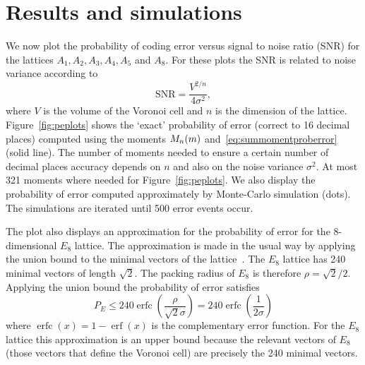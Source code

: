 \documentclass[journal]{IEEEtran}
\begin{document}
\section{Results and simulations}\label{sec:results-simulations}

We now plot the probability of coding error versus signal to noise ratio (SNR) for the lattices $A_1, A_2, A_3, A_4, A_5$ and $A_8$.  For these plots the SNR is related to noise variance according to~\cite{Viterbo_diamond_cutting_1996}
\[
\text{SNR} = \frac{V^{2/n}}{4\sigma^2},
\]
where $V$ is the volume of the Voronoi cell and $n$ is the dimension of the lattice.  Figure~\ref{fig:peplots} shows the `exact' probability of error (correct to 16 decimal places) computed using the moments $M_n(m)$ and~\eqref{eq:summomentproberror} (solid line).  The number of moments needed to ensure a certain number of decimal places accuracy depends on $n$ and also on the noise variance $\sigma^2$.  At most 321 moments where needed for Figure~\ref{fig:peplots}.  We also display the probability of error computed approximately by Monte-Carlo simulation (dots).  %
The simulations are iterated until 500 error events occur.

The plot also displays an approximation for the probability of error for the 8-dimensional $E_8$ lattice.  The approximation is made in the usual way by applying the union bound to the minimal vectors of the lattice~\cite[p.~71]{SPLAG}.  The $E_8$ lattice has 240 minimal vectors of length $\sqrt{2}$.  The packing radius of $E_8$ is therefore $\rho = \sqrt{2}/2$.  Applying the union bound the probability of error satisfies
\newcommand{\erfc}{\operatorname{erfc}}
\newcommand{\erf}{\operatorname{erf}}
\[
P_E \leq 240\erfc\left( \frac{\rho}{\sqrt{2}\sigma} \right) = 240\erfc\left(\frac{1}{2\sigma}\right)
\]
where $\erfc(x) = 1 - \erf(x)$ is the complementary error function.  For the $E_8$ lattice this approximation is an upper bound because the relevant vectors of $E_8$ (those vectors that define the Voronoi cell) are precisely the 240 minimal vectors.  %

\end{document}
